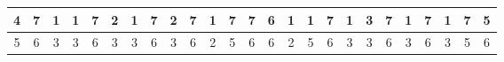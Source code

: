 \begin{sidewaystable}[]
\begin{tabular}{|c|c|c|c|c|c|c|c|c|c|c|c|c|c|c|c|c|c|c|c|c|c|c|c|c|}
    4       & 7                                               & 1                                               & 1                                               & 7                                               & 2                                               & 1                                               & 7                                               & 2                                               & 7                                               & 1                                                & 7                                                & 7                                                & 6                                               & 1                                               & 1                                               & 7                                               & 1                                               & 3                                               & 7                                               & 1                                                 & 7                                               & 1                                                & 7                                                & 5                                                \\ \hline
    5       & 6                                               & 3                                               & 3                                               & 6                                               & 3                                               & 3                                               & 6                                               & 3                                               & 6                                               & 2                                                & 5                                                & 6                                                & 6                                               & 2                                               & 5                                               & 6                                               & 3                                               & 3                                               & 6                                               & 3                                                 & 6                                               & 3                                                & 5                                                & 6                                                \\ \hline

\end{tabular}
\end{sidewaystable}
